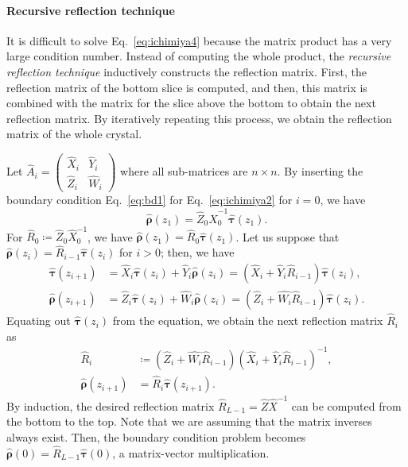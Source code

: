 \documentclass[preprint, 5p, times, sort&compress]{elsarticle}
\def\vtau{\bm{\tau}}
\def\vrho{\bm{\rho}}
\begin{document}
        \paragraph{Recursive reflection technique}
        It is difficult to solve Eq.~\eqref{eq:ichimiya4} because the matrix product has a very large condition number.
        Instead of computing the whole product, the \emph{recursive reflection technique} inductively
        constructs the reflection matrix.
        First, the reflection matrix of the bottom slice is computed, and
        then, this matrix is combined with the matrix for the slice above the bottom to obtain the next reflection matrix.
        By iteratively repeating this process, we obtain the reflection matrix of the whole crystal.

        Let $\hat{A}_i=\begin{pmatrix}
                \hat{X}_i & \hat{Y}_i \\
                \hat{Z}_i & \hat{W}_i
        \end{pmatrix}$ where all sub-matrices are $n\times n$.
        By inserting the boundary condition Eq.~\eqref{eq:bd1} for Eq.~\eqref{eq:ichimiya2} for $i=0$, we have
        \begin{equation}
                \hat{\vrho}(z_1) = \hat{Z}_0 \hat{X}_0^{-1} \hat{\vtau}(z_1).
        \end{equation}
        For $\hat{R}_0 \coloneqq \hat{Z}_0 \hat{X}_0^{-1}$, we have $\hat{\vrho}(z_1) = \hat{R}_0\hat{\vtau}(z_1)$.
        Let us suppose that $\hat{\vrho}(z_{i}) = \hat{R}_{i-1}\hat{\vtau}(z_i)$ for $i>0$; then,
        we have
        \begin{align}
                \hat{\vtau}(z_{i+1}) &= \hat{X}_i\hat{\vtau}(z_i) + \hat{Y}_i \hat{\vrho}(z_i) = \left(\hat{X}_i + \hat{Y}_i\hat{R}_{i-1}\right)\hat{\vtau}(z_i), \\
                \hat{\vrho}(z_{i+1}) &= \hat{Z}_i\hat{\vtau}(z_i) + \hat{W}_i \hat{\vrho}(z_i) = \left(\hat{Z}_i + \hat{W_i}\hat{R}_{i-1}\right)\hat{\vtau}(z_i).
        \end{align}
        Equating out $\hat{\vtau}(z_i)$ from the equation, we obtain the next reflection matrix $\hat{R}_i$ as
        \begin{align}
                \hat{R}_i &\coloneqq  \left(\hat{Z}_i+\hat{W_i}\hat{R}_{i-1}\right)\left(\hat{X}_i+\hat{Y}_i\hat{R}_{i-1}\right)^{-1}, \label{eq:ri1}\\
                \hat{\vrho}(z_{i+1}) &= \hat{R}_i\hat{\vtau}(z_{i+1}).
                \label{eq:ri2}
        \end{align}
        By induction, the desired reflection matrix $\hat{R}_{L-1}=\hat{Z}\hat{X}^{-1}$ can be computed from the bottom to the top.
        Note that we are assuming that the matrix inverses always exist.
        Then, the boundary condition problem becomes $\hat{\vrho}(0) = \hat{R}_{L-1}\hat{\vtau}(0)$, a matrix-vector multiplication.
\end{document}
